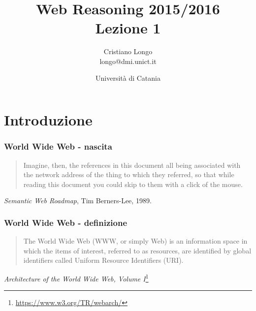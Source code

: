 \documentclass[8pt]{beamer}
\title{Web Reasoning 2015/2016\\
Lezione 1}
\author{Cristiano Longo\\ 
{\small{longo@dmi.unict.it}}}
\date{Universit\`a di Catania}
\begin{document}
\maketitle
\setcounter{tocdepth}{1}

\section{Introduzione}

\begin{frame}
\frametitle{World Wide Web - nascita}
\begin{quote}
Imagine, then, the references in this document all being associated with 
the network address of the thing to which they referred, so that while 
reading this document you could skip to them with a click of the mouse.
\end{quote}
\vspace{\baselineskip}
\emph{Semantic Web Roadmap}, Tim Berners-Lee, 1989.
\vspace{\baselineskip}

\end{frame}

\begin{frame}
\frametitle{World Wide Web - definizione}
\begin{quote}
The World Wide Web (WWW, or simply Web) is an information space in which
the items of interest, referred to as resources, are identified by global
identifiers called Uniform Resource Identifiers (URI).
\end{quote}
\vspace{\baselineskip}
\emph{Architecture of the World Wide Web, Volume
I}\footnote{\url{https://www.w3.org/TR/webarch/}}
\vspace{\baselineskip}

\end{frame}
\end{document}

